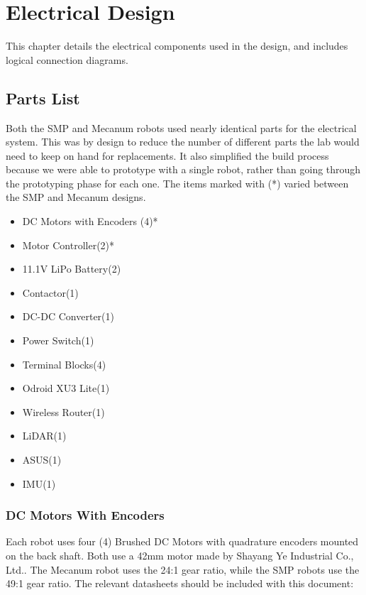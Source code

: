 
\chapter{Electrical Design}
\label{chap:elecdesign}

This chapter details the electrical components used in the design, and includes logical connection diagrams.

\section{Parts List}

Both the SMP and Mecanum robots used nearly identical parts for the electrical system. This was by design to reduce the number of different parts the lab would need to keep on hand for replacements. It also simplified the build process because we were able to prototype with a single robot, rather than going through the prototyping phase for each one. The items marked with (*) varied between the SMP and Mecanum designs.

\begin{itemize}
	\item{DC Motors with Encoders (4)*}
	\item{Motor Controller(2)*}
	\item{11.1V LiPo Battery(2)}
	\item{Contactor(1)}
	\item{DC-DC Converter(1)}
	\item{Power Switch(1)}
	\item{Terminal Blocks(4)}
	\item{Odroid XU3 Lite(1)}
	\item{Wireless Router(1)}
	\item{LiDAR(1)}
	\item{ASUS(1)}
	\item{IMU(1)}
\end{itemize}

\subsection{DC Motors With Encoders}

Each robot uses four (4) Brushed DC Motors with quadrature encoders mounted on the back shaft. Both use a 42mm motor made by Shayang Ye Industrial Co., Ltd.. The Mecanum robot uses the 24:1 gear ratio, while the SMP robots use the 49:1 gear ratio. The relevant datasheets should be included with this document:

